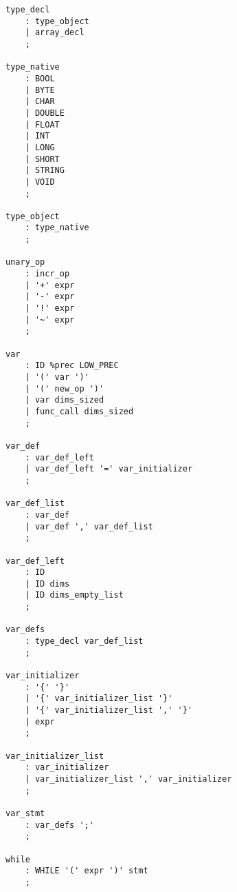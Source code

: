 \documentclass[a4paper]{article}
\begin{document}
\begin{verbatim}
type_decl
	: type_object
	| array_decl
	;

type_native
	: BOOL
	| BYTE
	| CHAR
	| DOUBLE
	| FLOAT
	| INT
	| LONG
	| SHORT
	| STRING
	| VOID
	;

type_object
	: type_native
	;

unary_op
	: incr_op
	| '+' expr
	| '-' expr
	| '!' expr
	| '~' expr
	;

var
	: ID %prec LOW_PREC
	| '(' var ')'
	| '(' new_op ')'
	| var dims_sized
	| func_call dims_sized
	;

var_def
	: var_def_left
	| var_def_left '=' var_initializer
	;

var_def_list
	: var_def
	| var_def ',' var_def_list
	;

var_def_left
	: ID
	| ID dims
	| ID dims_empty_list
	;

var_defs
	: type_decl var_def_list
	;

var_initializer
	: '{' '}'
	| '{' var_initializer_list '}'
	| '{' var_initializer_list ',' '}'
	| expr
	;

var_initializer_list
	: var_initializer
	| var_initializer_list ',' var_initializer
 	;

var_stmt															
	: var_defs ';'
	;

while
	: WHILE '(' expr ')' stmt
	;
\end{verbatim}
\end{document}
